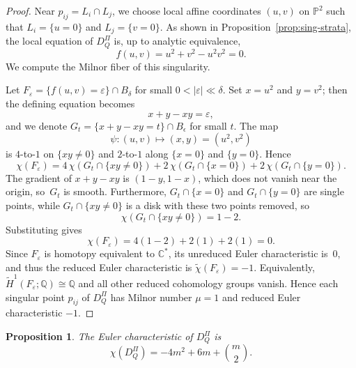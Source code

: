 \documentclass{article}
\newtheorem{proposition}{Proposition}
\newcommand{\PP}{\mathbb{P}}
\begin{document}
\begin{proof}
Near $p_{ij}=L_i\cap L_j$, we choose local affine coordinates $(u,v)$ on $\PP^2$ such that
$L_i=\{u=0\}$ and $L_j=\{v=0\}$.  As shown in Proposition~\ref{prop:sing-strata},
the local equation of $D_Q^\Pi$ is, up to analytic equivalence,
\[
f(u,v)=u^2+v^2-u^2v^2=0.
\]
We compute the Milnor fiber of this singularity.

Let $F_\varepsilon=\{f(u,v)=\varepsilon\}\cap B_\delta$ for small $0<|\varepsilon|\ll\delta$.  
Set $x=u^2$ and $y=v^2$; then the defining equation becomes
\[
x+y-xy=\varepsilon,
\]
and we denote $G_t=\{x+y-xy=t\}\cap B_\epsilon$ for small $t$.  
The map
\[
\psi:(u,v)\longmapsto(x,y)=(u^2,v^2)
\]
is $4$-to-$1$ on $\{xy\neq0\}$ and $2$-to-$1$ along $\{x=0\}$ and $\{y=0\}$.  
Hence
\[
\chi(F_\varepsilon)
=4\,\chi(G_t\cap\{xy\neq0\})
 +2\,\chi(G_t\cap\{x=0\})
 +2\,\chi(G_t\cap\{y=0\}).
\]
The gradient of $x+y-xy$ is $(1-y,1-x)$, which does not vanish near the origin,
so~$G_t$ is smooth. Furthermore, \(G_t\cap\{x=0\}\) and \(G_t\cap\{y=0\}\) are single points, while
\(G_t\cap\{xy\neq 0\}\) is a disk with these two points removed, so
\[
\chi(G_t\cap\{xy\neq 0\})=1-2.
\]
Substituting gives
\[
\chi(F_\varepsilon)=4(1-2)+2(1)+2(1)=0.
\]
Since $F_{\varepsilon}$ is homotopy equivalent to $\mathbb C^{*}$, its unreduced Euler characteristic is~$0$, and thus the reduced Euler characteristic is $\tilde\chi(F_\varepsilon)=-1$.
Equivalently,~\mbox{$\widetilde H^1(F_\varepsilon;\mathbb Q)\cong\mathbb Q$} and all other reduced cohomology groups vanish.  
Hence each singular point $p_{ij}$ of $D_Q^\Pi$ has Milnor number $\mu=1$ and reduced Euler characteristic $-1$.
\end{proof}

\begin{proposition}
\label{prop:chi-DQ}
The Euler characteristic of $D_Q^\Pi$ is
\[
\chi(D_Q^\Pi)
=-4m^2+6m+\binom{m}{2}.
\]
\end{proposition}
\end{document}
